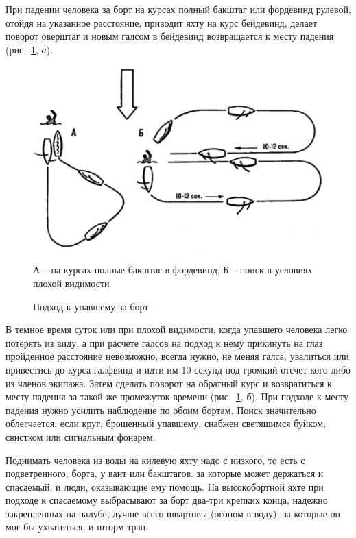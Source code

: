 \documentclass[a4paper, 12pt, twoside, final]{scrbook}
\begin{document}
При падении человека за борт на курсах полный бакштаг или фордевинд рулевой, отойдя на указанное расстояние, приводит яхту на курс бейдевинд, делает поворот оверштаг и новым галсом в бейдевинд возвращается к месту падения (рис.~\ref{fig:135}, \textit{а}). 

\begin{figure}[htbp]
   \centering
   \includegraphics{pics/135_Podhod_upavshemu_za_bort} %
   \caption{Подход к упавшему за борт}
   \label{fig:135}
   \centering\small
   А \--- на курсах полные бакштаг в фордевинд, Б \--- поиск в условиях плохой видимости
\end{figure}

В темное время суток или при плохой видимости, когда упавшего человека легко потерять из виду, а при расчете галсов на подход к нему прикинуть на глаз пройденное расстояние невозможно, всегда нужно, не меняя галса, увалиться или привестись до курса галфвинд и идти им 10 секунд под громкий отсчет кого-либо из членов экипажа. Затем сделать поворот на обратный курс и возвратиться к месту падения за такой же промежуток времени (рис.~\ref{fig:135}, \textit{б}). При подходе к месту падения нужно усилить наблюдение по обоим бортам. Поиск значительно облегчается, если круг, брошенный упавшему, снабжен светящимся буйком, свистком или сигнальным фонарем.

Поднимать человека из воды на килевую яхту надо с низкого, то есть с подветренного, борта, у вант или бакштагов. за которые может держаться и спасаемый, и люди, оказывающие ему помощь. На высокобортной яхте при подходе к спасаемому выбрасывают за борт два\--три крепких конца, надежно закрепленных на палубе, лучше всего швартовы (огоном в воду), за которые он мог бы ухватиться, и шторм-трап.
\end{document}
